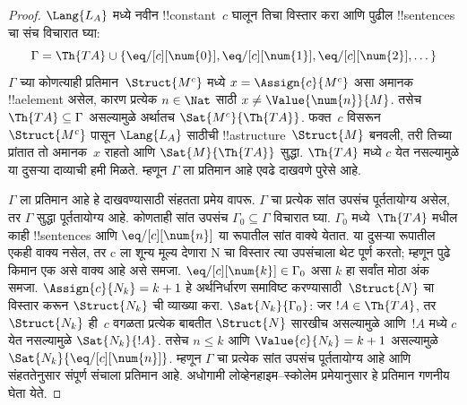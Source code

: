 \documentclass[../../../include/open-logic-section]{subfiles}
\begin{document}
\begin{proof}
$\Lang{L_A}$ मध्ये नवीन !!{constant}~$c$ घालून तिचा विस्तार करा आणि
पुढील !!{sentence}s चा संच विचारात घ्या:
\[
\Gamma = \Th{TA} \cup \{\eq/[c][\num{0}], \eq/[c][\num{1}],
\eq/[c][\num{2}], \dots\}
\]
$\Gamma$ च्या कोणत्याही प्रतिमान~$\Struct{M^c}$ मध्ये
$x = \Assign{c}{M^c}$ असा अमानक !!a{element} असेल, कारण प्रत्येक
$n \in \Nat$ साठी $x \neq \Value{\num{n}}{M}$. तसेच
$\Th{TA} \subseteq \Gamma$ असल्यामुळे अर्थातच $\Sat{M^c}{\Th{TA}}$.
फक्त~$c$ विसरून $\Struct{M^c}$ पासून $\Lang{L_A}$ साठीची
!!a{structure}~$\Struct{M}$ बनवली, तरी तिच्या प्रांतात तो अमानक~$x$ राहतो
आणि $\Sat{M}{\Th{TA}}$ सुद्धा. $\Th{TA}$ मध्ये $c$ येत नसल्यामुळे या
दुसऱ्या दाव्याची हमी मिळते. म्हणून $\Gamma$ ला प्रतिमान आहे एवढे दाखवणे
पुरेसे आहे.

$\Gamma$ ला प्रतिमान आहे हे दाखवण्यासाठी संहतता प्रमेय वापरू. $\Gamma$ चा
प्रत्येक सांत उपसंच पूर्ततायोग्य असेल, तर $\Gamma$ सुद्धा पूर्ततायोग्य आहे.
कोणताही सांत उपसंच $\Gamma_0 \subseteq \Gamma$ विचारात घ्या.
$\Gamma_0$ मध्ये~$\Th{TA}$ मधील काही !!{sentence}s आणि
$\eq/[c][\num{n}]$ या रूपातील सांत वाक्ये येतात. या दुसऱ्या रूपातील एकही
वाक्य नसेल, तर c ला शून्य मूल्य देणारा N चा विस्तार त्या उपसंचाला थेट
पूर्ण करतो; म्हणून पुढे किमान एक असे वाक्य आहे असे समजा.
$\eq/[c][\num{k}] \in \Gamma_0$ असा $k$ हा सर्वांत मोठा अंक समजा.
$\Assign{c}{N_k} = k+1$ हे अर्थनिर्धारण समाविष्ट करण्यासाठी~$\Struct{N}$
चा विस्तार करून $\Struct{N_k}$ ची व्याख्या करा. $\Sat{N_k}{\Gamma_0}$:
जर $!A \in \Th{TA}$, तर $\Struct{N_k}$ ही~$c$ वगळता प्रत्येक बाबतीत
$\Struct{N}$ सारखीच असल्यामुळे आणि~$!A$ मध्ये $c$ येत नसल्यामुळे
$\Sat{N_k}{!A}$. तसेच $n \le k$ आणि $\Value{c}{N_k} = k+1$ असल्यामुळे
$\Sat{N_k}{\eq/[c][\num{n}]}$. म्हणून $\Gamma$ चा प्रत्येक सांत उपसंच
पूर्ततायोग्य आहे आणि संहततेनुसार संपूर्ण संचाला प्रतिमान आहे. अधोगामी
लोव्हेनहाइम--स्कोलेम प्रमेयानुसार हे प्रतिमान गणनीय घेता येते.
\end{proof}
\end{document}
